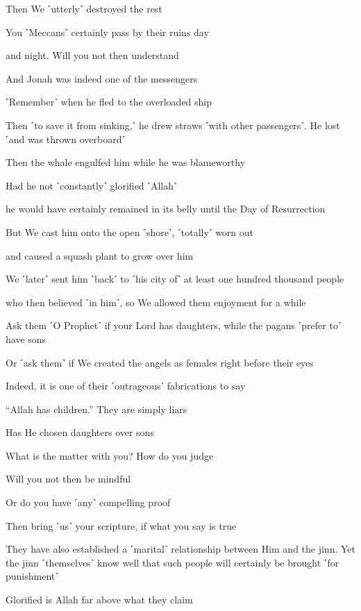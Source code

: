 Then We ˹utterly˺ destroyed the rest

You ˹Meccans˺ certainly pass by their ruins day

and night. Will you not then understand

And Jonah was indeed one of the messengers

˹Remember˺ when he fled to the overloaded ship

Then ˹to save it from sinking,˺ he drew straws ˹with other passengers˺. He lost ˹and was thrown overboard˺

Then the whale engulfed him while he was blameworthy

Had he not ˹constantly˺ glorified ˹Allah˺

he would have certainly remained in its belly until the Day of Resurrection

But We cast him onto the open ˹shore˺, ˹totally˺ worn out

and caused a squash plant to grow over him

We ˹later˺ sent him ˹back˺ to ˹his city of˺ at least one hundred thousand people

who then believed ˹in him˺, so We allowed them enjoyment for a while

Ask them ˹O Prophet˺ if your Lord has daughters, while the pagans ˹prefer to˺ have sons

Or ˹ask them˺ if We created the angels as females right before their eyes

Indeed, it is one of their ˹outrageous˺ fabrications to say

“Allah has children.” They are simply liars

Has He chosen daughters over sons

What is the matter with you? How do you judge

Will you not then be mindful

Or do you have ˹any˺ compelling proof

Then bring ˹us˺ your scripture, if what you say is true

They have also established a ˹marital˺ relationship between Him and the jinn. Yet the jinn ˹themselves˺ know well that such people will certainly be brought ˹for punishment˺

Glorified is Allah far above what they claim

